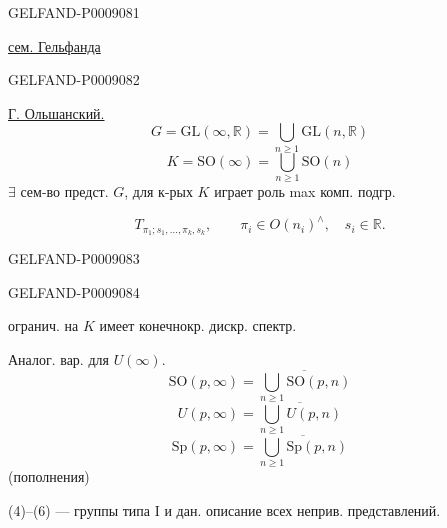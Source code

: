 \begin{GelfandAdjacentEvidence}{GELFAND-P000908}{1}

\quad\uline{сем. Гельфанда}
\end{GelfandAdjacentEvidence}
\begin{GelfandAdjacentEvidence}{GELFAND-P000908}{2}


\uline{Г. Ольшанский.}
\begin{equation*}
G=\mathrm{GL}(\infty,\mathbb R)=\bigcup_{n\ge1}\mathrm{GL}(n,\mathbb R)
\tag{1}
\end{equation*}
\begin{equation*}
K=\mathrm{SO}(\infty)=\bigcup_{n\ge1}\mathrm{SO}(n)
\tag{2}
\end{equation*}
$\exists$ сем-во предст. $G$, для к-рых $K$ играет роль max комп. подгр.

\begin{equation*}
T_{\pi_1;s_1,\ldots,\pi_k,s_k},\qquad
\pi_i\in O(n_i)^{\wedge},\quad s_i\in\mathbb R.
\tag{3}
\end{equation*}
\end{GelfandAdjacentEvidence}
\begin{GelfandAdjacentEvidence}{GELFAND-P000908}{3}


\end{GelfandAdjacentEvidence}
\begin{GelfandAdjacentEvidence}{GELFAND-P000908}{4}

огранич. на $K$ имеет конечнокр. дискр. спектр.

Аналог. вар. для $U(\infty)$.
\begin{equation*}
\mathrm{SO}(p,\infty)=\overline{\bigcup_{n\ge1}\mathrm{SO}(p,n)}
\tag{4}
\end{equation*}
\begin{equation*}
U(p,\infty)=\overline{\bigcup_{n\ge1}U(p,n)}
\tag{5}
\end{equation*}
\begin{equation*}
\mathrm{Sp}(p,\infty)=\overline{\bigcup_{n\ge1}\mathrm{Sp}(p,n)}
\tag{6}
\end{equation*}
(пополнения)

(4)–(6) --- группы типа I и дан. описание всех неприв. представлений.
\end{GelfandAdjacentEvidence}
